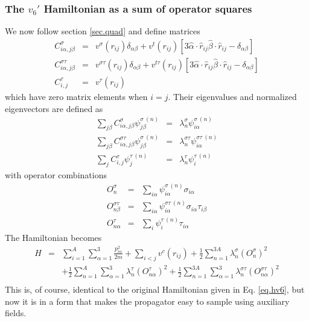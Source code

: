  \subsubsection{The $v_6'$ Hamiltonian as a sum of operator squares}
 We now follow section \ref{sec.quad} and define matrices
 \begin{eqnarray}
 C^\sigma_{i\alpha,j\beta} &=& 
 v^\sigma(r_{ij})\delta_{\alpha\beta}+v^t(r_{ij})
 \left [  3 \hat \alpha \cdot \hat r_{ij}
 \hat \beta \cdot \hat r_{ij} -\delta_{\alpha\beta} \right]
 \nonumber\\
 C^{\sigma\tau}_{i\alpha,j\beta} &= &
 v^{\sigma\tau}(r_{ij})\delta_{\alpha\beta}+v^{t\tau}(r_{ij})
 \left [  3 \hat \alpha \cdot \hat r_{ij}
 \hat \beta \cdot \hat r_{ij} -\delta_{\alpha\beta} \right]
 \nonumber\\
 C^\tau_{i,j} &=& v^\tau(r_{ij})
 \end{eqnarray}
 which have zero matrix elements when $i=j$. Their eigenvalues and
 normalized eigenvectors are defined as
 \begin{eqnarray}
 \sum_{j\beta}
 C^\sigma_{i\alpha,j\beta} \psi^{\sigma\ (n)}_{j\beta} &=& \lambda^\sigma_n
 \psi^{\sigma\ (n)}_{i\alpha}
 \nonumber\\
 \sum_{j\beta}
 C^{\sigma\tau}_{i\alpha,j\beta} \psi^{\sigma\ (n)}_{j\beta} &=&
 \lambda^{\sigma\tau}_n \psi^{\sigma\tau\ (n)}_{i\alpha}
 \nonumber\\
 \sum_{j}
 C^{\tau}_{i,j} \psi^{\tau\ (n)}_{j} &=&
 \lambda^{\tau}_n \psi^{\tau\ (n)}_{i}
 \end{eqnarray}
 with operator combinations
 \begin{eqnarray}
 O^\sigma_n &=& \sum_{i\alpha} \psi^{\sigma\ (n)}_{i\alpha} \sigma_{i\alpha}
 \nonumber\\
 O^{\sigma\tau}_{n\beta} &=& 
 \sum_{i\alpha} \psi^{\sigma\tau\ (n)}_{i\alpha} \sigma_{i\alpha}\tau_{i\beta}
 \nonumber\\
 O^\tau_{n\alpha} &=&
 \sum_{i} \psi^{\tau\ (n)}_{i} \tau_{i\alpha}
 \end{eqnarray}
 The Hamiltonian becomes
 \begin{eqnarray}
 H&=&\sum_{i=1}^A\sum_{\alpha=1}^3 \frac{p_{i\alpha}^2}{2m}
 +\sum_{i<j} v^{c}(r_{ij})
 +\frac{1}{2} \sum_{n=1}^{3A} \lambda^\sigma_n (O^\sigma_n)^2
 \nonumber\\
 &&
 +\frac{1}{2} \sum_{n=1}^{A}\sum_{\alpha=1}^3
 \lambda^\tau_n(O^\tau_{n\alpha})^2
 +\frac{1}{2} \sum_{n=1}^{3A} \sum_{\alpha=1}^3
 \lambda^{\sigma\tau}_n(O^{\sigma\tau}_{n\alpha})^2
 \nonumber\\
 \end{eqnarray}
 This is, of course, identical to the original Hamiltonian given in
 Eq. \ref{eq.hv6}, but now it is in a form that makes the propagator
 easy to sample using auxiliary fields.
 
